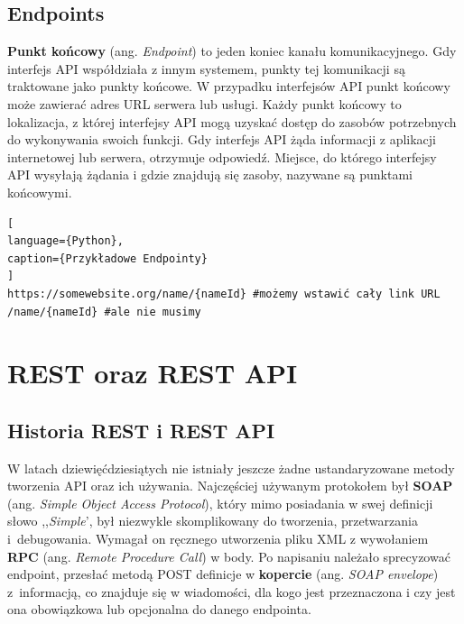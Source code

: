 \documentclass[oneside,polski,logo,indent]{amuthesis}
\begin{document}

\begin{center}
\subsection{Endpoints}
\end{center}
\textbf{Punkt końcowy} (ang. \emph{Endpoint}) to jeden koniec kanału komunikacyjnego. Gdy interfejs API współdziała z innym systemem, punkty tej komunikacji są traktowane jako punkty końcowe. W przypadku interfejsów API punkt końcowy może zawierać adres URL serwera lub usługi. Każdy punkt końcowy to lokalizacja, z której interfejsy API mogą uzyskać dostęp do zasobów potrzebnych do wykonywania swoich funkcji. Gdy interfejs API żąda informacji z aplikacji internetowej lub serwera, otrzymuje odpowiedź. Miejsce, do którego interfejsy API wysyłają żądania i gdzie znajdują się zasoby, nazywane są punktami końcowymi.

\begin{lstlisting}[
language={Python},
caption={Przykładowe Endpointy}
]
https://somewebsite.org/name/{nameId} #możemy wstawić cały link URL
/name/{nameId} #ale nie musimy
\end{lstlisting}

\newpage 
\section{REST oraz REST API}

\begin{center}
\subsection{Historia REST i REST API}
\end{center}

W latach dziewięćdziesiątych nie istniały jeszcze żadne ustandaryzowane metody tworzenia API oraz ich używania. Najczęściej używanym protokołem był \textbf{SOAP} (ang. \emph{Simple Object Access Protocol}), który mimo posiadania w swej definicji słowo ,,\emph{Simple}', był niezwykle skomplikowany do tworzenia, przetwarzania i~debugowania. Wymagał on ręcznego utworzenia pliku XML z wywołaniem \textbf{RPC} (ang. \emph{Remote Procedure Call}) w body. Po napisaniu należało sprecyzować endpoint, przesłać metodą POST definicje w \textbf{kopercie} (ang. \emph{SOAP envelope}) z~informacją, co znajduje się w wiadomości, dla kogo jest przeznaczona i czy jest ona obowiązkowa lub opcjonalna do danego endpointa.
\end{document}
